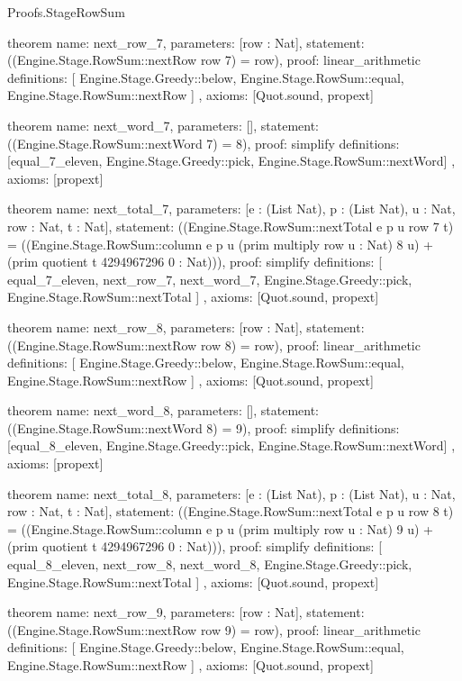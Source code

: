 \begin{lexlean}{Proofs.StageRowSum}
\begin{semanticmodule}
theorem{
  name: next_row_7,
  parameters: [row : Nat],
  statement: ((Engine.Stage.RowSum::nextRow row 7) = row),
  proof: linear_arithmetic{
    definitions: [
      Engine.Stage.Greedy::below,
      Engine.Stage.RowSum::equal,
      Engine.Stage.RowSum::nextRow
    ]
  },
  axioms: [Quot.sound, propext]
}

theorem{
  name: next_word_7,
  parameters: [],
  statement: ((Engine.Stage.RowSum::nextWord 7) = 8),
  proof: simplify{
    definitions: [equal_7_eleven, Engine.Stage.Greedy::pick, Engine.Stage.RowSum::nextWord]
  },
  axioms: [propext]
}

theorem{
  name: next_total_7,
  parameters: [e : (List Nat), p : (List Nat), u : Nat, row : Nat, t : Nat],
  statement: ((Engine.Stage.RowSum::nextTotal e p u row 7 t) = ((Engine.Stage.RowSum::column e p u (prim multiply row u : Nat) 8 u) + (prim quotient t 4294967296 0 : Nat))),
  proof: simplify{
    definitions: [
      equal_7_eleven,
      next_row_7,
      next_word_7,
      Engine.Stage.Greedy::pick,
      Engine.Stage.RowSum::nextTotal
    ]
  },
  axioms: [Quot.sound, propext]
}

theorem{
  name: next_row_8,
  parameters: [row : Nat],
  statement: ((Engine.Stage.RowSum::nextRow row 8) = row),
  proof: linear_arithmetic{
    definitions: [
      Engine.Stage.Greedy::below,
      Engine.Stage.RowSum::equal,
      Engine.Stage.RowSum::nextRow
    ]
  },
  axioms: [Quot.sound, propext]
}

theorem{
  name: next_word_8,
  parameters: [],
  statement: ((Engine.Stage.RowSum::nextWord 8) = 9),
  proof: simplify{
    definitions: [equal_8_eleven, Engine.Stage.Greedy::pick, Engine.Stage.RowSum::nextWord]
  },
  axioms: [propext]
}

theorem{
  name: next_total_8,
  parameters: [e : (List Nat), p : (List Nat), u : Nat, row : Nat, t : Nat],
  statement: ((Engine.Stage.RowSum::nextTotal e p u row 8 t) = ((Engine.Stage.RowSum::column e p u (prim multiply row u : Nat) 9 u) + (prim quotient t 4294967296 0 : Nat))),
  proof: simplify{
    definitions: [
      equal_8_eleven,
      next_row_8,
      next_word_8,
      Engine.Stage.Greedy::pick,
      Engine.Stage.RowSum::nextTotal
    ]
  },
  axioms: [Quot.sound, propext]
}

theorem{
  name: next_row_9,
  parameters: [row : Nat],
  statement: ((Engine.Stage.RowSum::nextRow row 9) = row),
  proof: linear_arithmetic{
    definitions: [
      Engine.Stage.Greedy::below,
      Engine.Stage.RowSum::equal,
      Engine.Stage.RowSum::nextRow
    ]
  },
  axioms: [Quot.sound, propext]
}


\end{semanticmodule}
\end{lexlean}
